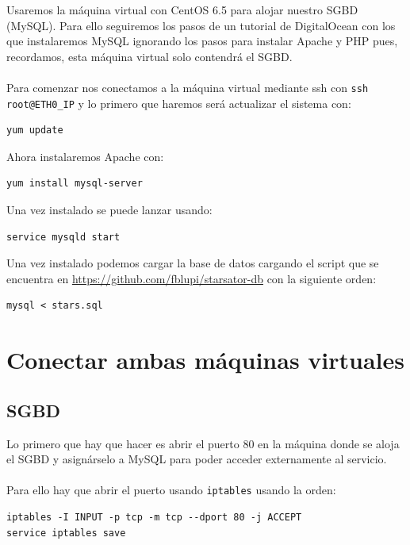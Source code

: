 Usaremos la máquina virtual con CentOS 6.5 para alojar nuestro SGBD (MySQL). Para ello seguiremos los pasos de un tutorial de DigitalOcean \cite{InstallLAMPCentos6.5} con los que instalaremos MySQL ignorando los pasos para instalar Apache y PHP pues, recordamos, esta máquina virtual solo contendrá el SGBD.
\\ \\
Para comenzar nos conectamos a la máquina virtual mediante ssh con \texttt{ssh root@ETH0\_IP} y lo primero que haremos será actualizar el sistema con:

\begin{lstlisting}
yum update
\end{lstlisting}

Ahora instalaremos Apache con:

\begin{lstlisting}
yum install mysql-server
\end{lstlisting}

Una vez instalado se puede lanzar usando:

\begin{lstlisting}
service mysqld start
\end{lstlisting}

Una vez instalado podemos cargar la base de datos cargando el script que se encuentra en \url{https://github.com/fblupi/starsator-db} con la siguiente orden:

\begin{lstlisting}
mysql < stars.sql
\end{lstlisting}

\section{Conectar ambas máquinas virtuales}

\subsection{SGBD}

Lo primero que hay que hacer es abrir el puerto 80 en la máquina donde se aloja el SGBD y asignárselo a MySQL para poder acceder externamente al servicio.
\\ \\
Para ello hay que abrir el puerto usando \texttt{iptables} \cite{OpenPortIptables} usando la orden:

\begin{lstlisting}
iptables -I INPUT -p tcp -m tcp --dport 80 -j ACCEPT
service iptables save
\end{lstlisting}


